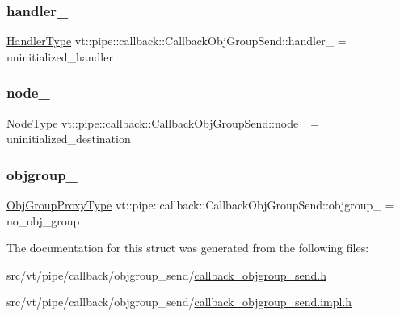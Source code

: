 \subsubsection{\texorpdfstring{handler\+\_\+}{handler\_}}
{\footnotesize\ttfamily \hyperlink{namespacevt_af64846b57dfcaf104da3ef6967917573}{Handler\+Type} vt\+::pipe\+::callback\+::\+Callback\+Obj\+Group\+Send\+::handler\+\_\+ = uninitialized\+\_\+handler\hspace{0.3cm}{\ttfamily [private]}}

\mbox{\label{structvt_1_1pipe_1_1callback_1_1_callback_obj_group_send_af35c63aed6fa74b41ff75d54216bdc0c}} 
\subsubsection{\texorpdfstring{node\+\_\+}{node\_}}
{\footnotesize\ttfamily \hyperlink{namespacevt_a866da9d0efc19c0a1ce79e9e492f47e2}{Node\+Type} vt\+::pipe\+::callback\+::\+Callback\+Obj\+Group\+Send\+::node\+\_\+ = uninitialized\+\_\+destination\hspace{0.3cm}{\ttfamily [private]}}

\mbox{\label{structvt_1_1pipe_1_1callback_1_1_callback_obj_group_send_a975adbdb55edfb825eeb61602a06c562}} 
\subsubsection{\texorpdfstring{objgroup\+\_\+}{objgroup\_}}
{\footnotesize\ttfamily \hyperlink{namespacevt_ad7cae989df485fccca57f0792a880a8e}{Obj\+Group\+Proxy\+Type} vt\+::pipe\+::callback\+::\+Callback\+Obj\+Group\+Send\+::objgroup\+\_\+ = no\+\_\+obj\+\_\+group\hspace{0.3cm}{\ttfamily [private]}}



The documentation for this struct was generated from the following files\+:\begin{DoxyCompactItemize}
\item 
src/vt/pipe/callback/objgroup\+\_\+send/\hyperlink{callback__objgroup__send_8h}{callback\+\_\+objgroup\+\_\+send.\+h}\item 
src/vt/pipe/callback/objgroup\+\_\+send/\hyperlink{callback__objgroup__send_8impl_8h}{callback\+\_\+objgroup\+\_\+send.\+impl.\+h}\end{DoxyCompactItemize}
